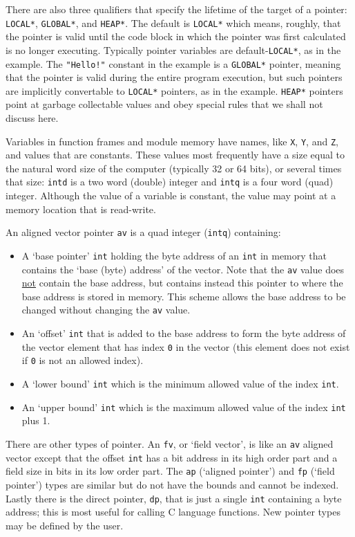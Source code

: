 \documentclass[12pt]{article}
\begin{document}
There are also three qualifiers that specify the lifetime of the target
of a pointer: {\tt *LOCAL*}, {\tt *GLOBAL*}, and {\tt *HEAP*}.  The
default is {\tt *LOCAL*} which means, roughly, that the pointer is valid until
the code block in which the pointer was first calculated is no
longer executing.  Typically pointer variables are default-{\tt *LOCAL*},
as in the example.  The {\tt "Hello!"} constant in the example is
a {\tt *GLOBAL*} pointer, meaning that the pointer is valid during the
entire program execution, but such pointers are implicitly convertable
to {\tt *LOCAL*} pointers, as in the example.  {\tt *HEAP*} pointers
point at garbage collectable values and obey special rules that we
shall not discuss here.

Variables in function frames and module memory
have names, like {\tt X}, {\tt Y}, and {\tt Z}, and values
that are constants.
These values most frequently
have a size equal to the natural
word size of the computer (typically 32 or 64 bits), or
several times that size: {\tt intd} is a two word (double) integer
and {\tt intq} is a four word (quad) integer.
Although the value of a variable is constant, the value may point
at a memory location that is read-write.

An aligned vector pointer {\tt av} is a
quad integer ({\tt intq}) containing:
\begin{itemize}
\item A `base pointer' {\tt int} holding the byte address
of an {\tt int} in memory
that contains the `base (byte) address' of the vector.
Note that the {\tt av} value does \underline{not} contain
the base address, but contains instead this pointer to where
the base address is stored in memory.  This scheme allows
the base address to be changed without changing the {\tt av} value.
\item An `offset' {\tt int} that is added to the base address
to form the byte address of the vector element
that has index {\tt 0} in the vector (this element does not
exist if {\tt 0} is not an allowed index).
\item A `lower bound' {\tt int} which is the minimum allowed
value of the index {\tt int}.
\item An `upper bound' {\tt int} which is the maximum allowed
value of the index {\tt int} plus 1.
\end{itemize}

There are other types of pointer.  An {\tt fv}, or `field vector',
is like an {\tt av} aligned
vector except that the offset {\tt int} has a bit address in its
high order part and a field size in bits in its low order part.
The {\tt ap} (`aligned pointer') and {\tt fp} (`field pointer')  types are
similar but do not have the bounds and cannot be indexed.  Lastly
there is the direct pointer, {\tt dp}, that is just a single {\tt int}
containing a byte address; this is most useful for calling
C language functions.
New pointer types may be defined by the user.
\end{document}
